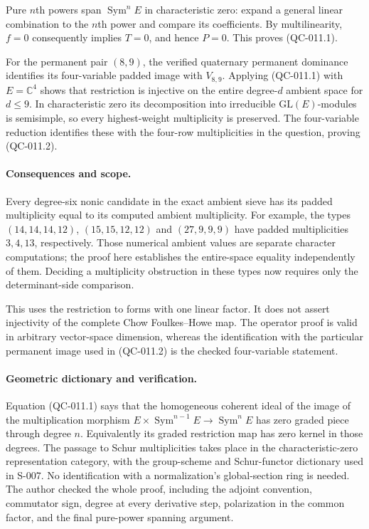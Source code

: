 Pure $n$th powers span $\operatorname{Sym}^nE$ in characteristic
zero: expand a general linear combination to the $n$th power and
compare its coefficients.  By multilinearity, $f=0$ consequently
implies $T=0$, and hence $P=0$.  This proves (QC-011.1).

For the permanent pair $(8,9)$, the verified quaternary permanent
dominance identifies its four-variable padded image with
$V_{8,9}$.  Applying (QC-011.1) with $E=\mathbb C^4$ shows
that restriction is injective on the entire degree-$d$ ambient
space for $d\leq9$.  In characteristic zero its decomposition into
irreducible $\mathrm{GL}(E)$-modules is semisimple, so every
highest-weight multiplicity is preserved.  The four-variable
reduction identifies these with the four-row multiplicities in
the question, proving (QC-011.2).

\paragraph{Consequences and scope.}
Every degree-six nonic candidate in the exact ambient sieve has
its padded multiplicity equal to its computed ambient multiplicity.
For example, the types $(14,14,14,12)$, $(15,15,12,12)$ and
$(27,9,9,9)$ have padded multiplicities $3,4,13$, respectively.
Those numerical ambient values are separate character computations;
the proof here establishes the entire-space equality independently
of them.  Deciding a multiplicity obstruction in these types now
requires only the determinant-side comparison.

This uses the restriction to forms with one linear factor.  It does
not assert injectivity of the complete Chow Foulkes--Howe map.
The operator proof is valid in arbitrary vector-space dimension,
whereas the identification with the particular permanent image used
in (QC-011.2) is the checked four-variable statement.

\paragraph{Geometric dictionary and verification.}
Equation (QC-011.1) says that the homogeneous coherent ideal of the
image of the multiplication morphism
$E\times\operatorname{Sym}^{n-1}E\to\operatorname{Sym}^nE$
has zero graded piece through degree $n$.  Equivalently its graded
restriction map has zero kernel in those degrees.  The passage to
Schur multiplicities takes place in the characteristic-zero
representation category, with the group-scheme and Schur-functor
dictionary used in S-007.  No identification with a normalization's
global-section ring is needed.
The author checked the whole proof, including the adjoint convention,
commutator sign, degree at every derivative step, polarization in
the common factor, and the final pure-power spanning argument.
